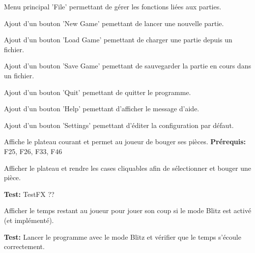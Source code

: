 \documentclass{article}
\begin{document}
\begin{needbox}
    Menu principal 'File' permettant de gérer les fonctions liées aux parties.
    \begin{subneedbox}
        Ajout d'un bouton 'New Game' pemettant de lancer une nouvelle partie.
    \end{subneedbox}
    \begin{subneedbox}
        Ajout d'un bouton 'Load Game' pemettant de charger une partie depuis un fichier.
    \end{subneedbox}
    \begin{subneedbox}
        Ajout d'un bouton 'Save Game' pemettant de sauvegarder la partie en cours dans un fichier.
    \end{subneedbox}
    \begin{subneedbox}[F47.4: Quit]
        Ajout d'un bouton 'Quit' pemettant de quitter le programme.
    \end{subneedbox}
    \begin{subneedbox}[F47.5: Help]
        Ajout d'un bouton 'Help' pemettant d'afficher le message d'aide.
    \end{subneedbox}
    \begin{subneedbox}[F47.6: Settings]
        Ajout d'un bouton 'Settings' pemettant d'éditer la configuration par défaut.
    \end{subneedbox}
\end{needbox}

\begin{needbox}
    Affiche le plateau courant et permet au joueur de bouger ses pièces.
    \textbf{Prérequis:} F25, F26, F33, F46
    \begin{subneedbox}
        Afficher le plateau et rendre les cases cliquables afin de sélectionner et 
        bouger une pièce.

        \textbf{Test:} TestFX ??
    \end{subneedbox}
    \begin{subneedbox}
        Afficher le temps restant au joueur pour jouer son coup si le mode Blitz est activé (et implémenté).

        \textbf{Test:} Lancer le programme avec le mode Blitz et vérifier que le temps s'écoule correctement.
    \end{subneedbox}
\end{needbox}
\end{document}
